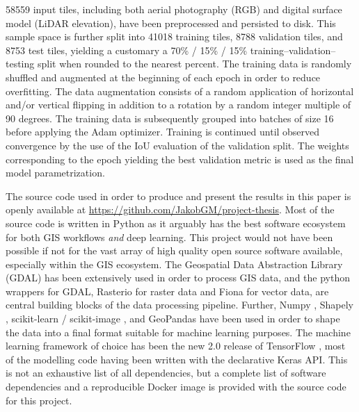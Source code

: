 

\num{58559} input tiles, including both aerial photography (RGB) and digital surface model (LiDAR elevation), have been preprocessed and persisted to disk.
This sample space is further split into \num{41018} training tiles, \num{8788} validation tiles, and \num{8753} test tiles, yielding a customary a 70\% / 15\% / 15\% training--validation--testing split when rounded to the nearest percent.
The training data is randomly shuffled and augmented at the beginning of each epoch in order to reduce overfitting.
The data augmentation consists of a random application of horizontal and/or vertical flipping in addition to a rotation by a random integer multiple of 90 degrees.
The training data is subsequently grouped into batches of size 16 before applying the Adam optimizer.
Training is continued until observed convergence by the use of the IoU evaluation of the validation split.
The weights corresponding to the epoch yielding the best validation metric is used as the final model parametrization.


The source code used in order to produce and present the results in this paper is openly available at \url{https://github.com/JakobGM/project-thesis}.
Most of the source code is written in Python as it arguably has the best software ecosystem for both GIS workflows \emph{and} deep learning.
This project would not have been possible if not for the vast array of high quality open source software available, especially within the GIS ecosystem.
The Geospatial Data Abstraction Library (GDAL) \cite{dep:gdal} has been extensively used in order to process GIS data, and the python wrappers for GDAL, Rasterio \cite{dep:rasterio} for raster data and Fiona \cite{dep:fiona} for vector data, are central building blocks of the data processing pipeline.
Further, Numpy \cite{dep:numpy}, Shapely \cite{dep:shapely}, scikit-learn \cite{dep:sklearn} / scikit-image \cite{dep:sklearn}, and GeoPandas \cite{dep:geopandas} have been used in order to shape the data into a final format suitable for machine learning purposes.
The machine learning framework of choice has been the new 2.0 release of TensorFlow \cite{dep:tensorflow}, most of the modelling code having been written with the declarative Keras API.
This is not an exhaustive list of all dependencies, but a complete list of software dependencies and a reproducible Docker \cite{dep:docker} image is provided with the source code for this project.

